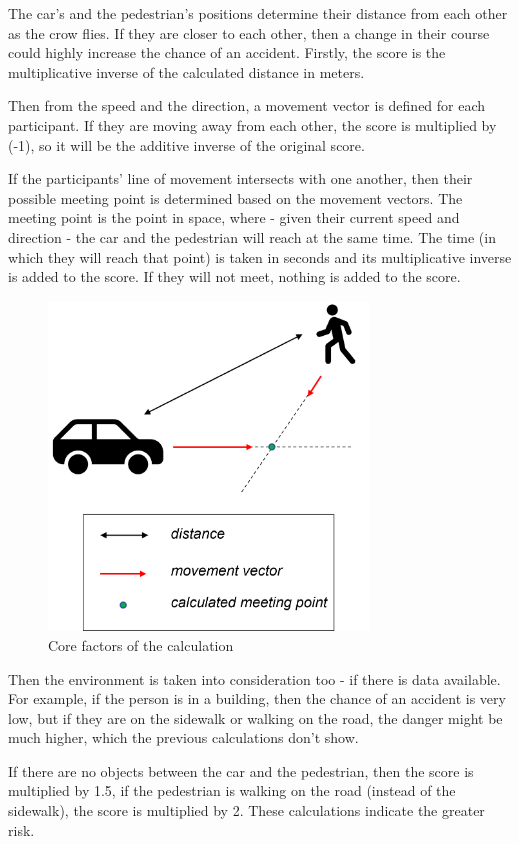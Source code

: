 \documentclass[conference]{IEEEtran}
\begin{document}
The car's and the pedestrian's positions determine their distance from each other as the crow flies. If they are closer to each other, then a change in their course could highly increase the chance of an accident. Firstly, the score is the multiplicative inverse of the calculated distance in meters.

Then from the speed and the direction, a movement vector is defined for each participant. If they are moving away from each other, the score is multiplied by (-1), so it will be the additive inverse of the original score.

If the participants' line of movement intersects with one another, then their possible meeting point is determined based on the movement vectors. The meeting point is the point in space, where - given their current speed and direction - the car and the pedestrian will reach at the same time. The time (in which they will reach that point) is taken in seconds and its multiplicative inverse is added to the score. If they will not meet, nothing is added to the score.

\begin{figure}[h]
    \centering
    \includegraphics[width=8.5cm]{./pics/Core factors of the calculation.png}
    \caption{Core factors of the calculation}
\end{figure}

Then the environment is taken into consideration too - if there is data available. For example, if the person is in a building, then the chance of an accident is very low, but if they are on the sidewalk or walking on the road, the danger might be much higher, which the previous calculations don't show.

If there are no objects between the car and the pedestrian, then the score is multiplied by 1.5, if the pedestrian is walking on the road (instead of the sidewalk), the score is multiplied by 2. These calculations indicate the greater risk.
\end{document}
